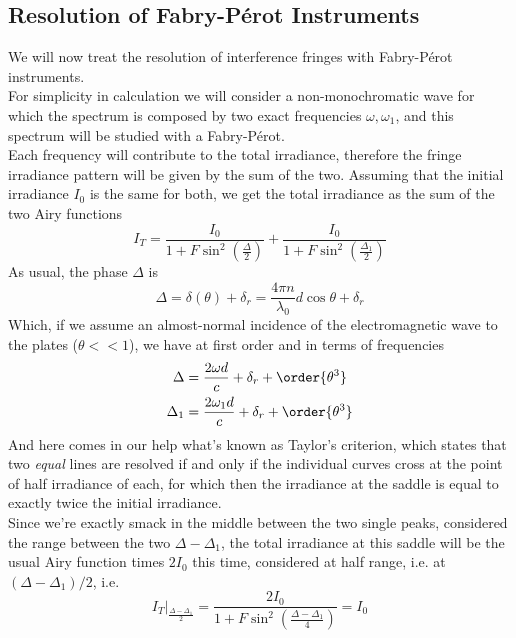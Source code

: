 \documentclass[../electromagnetism.tex]{subfiles}
\begin{document}
\subsection{Resolution of Fabry-Pérot Instruments}
We will now treat the resolution of interference fringes with Fabry-Pérot instruments.\\
For simplicity in calculation we will consider a non-monochromatic wave for which the spectrum is composed by two exact frequencies $\omega,\omega_1$, and this spectrum will be studied with a Fabry-Pérot.\\
Each frequency will contribute to the total irradiance, therefore the fringe irradiance pattern will be given by the sum of the two. Assuming that the initial irradiance $I_0$ is the same for both, we get the total irradiance as the sum of the two Airy functions
\begin{equation}
	I_T=\frac{I_0}{1+F\sin^2\left( \frac{\Delta}{2} \right)}+\frac{I_0}{1+F\sin^2\left( \frac{\Delta_1}{2} \right)}
	\label{eq:irradiancerfpi}
\end{equation}
As usual, the phase $\Delta$ is
\begin{equation*}
	\Delta=\delta(\theta)+\delta_r=\frac{4\pi n}{\lambda_0}d\cos\theta+\delta_r
\end{equation*}
Which, if we assume an almost-normal incidence of the electromagnetic wave to the plates ($\theta<<1$), we have at first order and in terms of frequencies
\begin{equation*}
	\begin{aligned}
		\Delta&= \frac{2\omega d}{c}+\delta_r+\order{\theta^3}\\
		\Delta_1&= \frac{2\omega_1d}{c}+\delta_r+\order{\theta^3}
	\end{aligned}
\end{equation*}
And here comes in our help what's known as Taylor's criterion, which states that two \textit{equal} lines are resolved if and only if the individual curves cross at the point of half irradiance of each, for which then the irradiance at the saddle is equal to exactly twice the initial irradiance.\\
Since we're exactly smack in the middle between the two single peaks, considered the range between the two $\Delta-\Delta_1$, the total irradiance at this saddle will be the usual Airy function times $2I_0$ this time, considered at half range, i.e. at $(\Delta-\Delta_1)/2$, i.e.
\begin{equation}
	\left. I_T \right|_{\frac{\Delta-\Delta_1}{2}}=\frac{2I_0}{1+F\sin^2\left( \frac{\Delta-\Delta_1}{4} \right)}=I_0
	\label{eq:saddleintfpir}
\end{equation}
\end{document}

